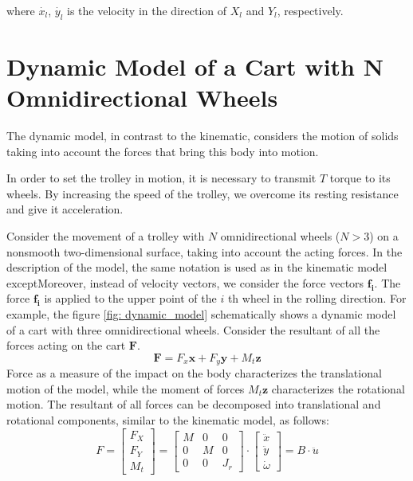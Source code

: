 \documentclass[oneside,final,14pt]{extreport}
\newcommand{\bs}{\boldsymbol}
\begin{document}
where $ \dot{x_{l}} $, $ \dot{y_{l}} $ is the velocity in the direction of $ X_{l} $ and $ Y_{l} $, respectively.
\fi

\chapter{Dynamic Model of a Cart with N Omnidirectional Wheels}
The dynamic model, in contrast to the kinematic, considers the motion of solids taking into account the forces that bring this body into motion.
 
In order to set the trolley in motion, it is necessary to transmit $ T $ torque to its wheels. By increasing the speed of the trolley, we overcome its resting resistance and give it acceleration.
 
Consider the movement of a trolley with $ N $ omnidirectional wheels ($ N> 3 $) on a nonsmooth two-dimensional surface, taking into account the acting forces. In the description of the model, the same notation is used as in the kinematic model exceptMoreover, instead of velocity vectors, we consider the force vectors $ \bs{f_{i}} $. The force $ \bs{f_{i}} $ is applied to the upper point of the $ i $ th wheel in the rolling direction. For example, the figure \ref{fig: dynamic_model} schematically shows a dynamic model of a cart with three omnidirectional wheels. Consider the resultant of all the forces acting on the cart $ \bs{F} $.
\begin{equation}
\bs{F}
=
F_{x} \bs{x}
+
F_{y} \bs{y}
+
M_{t} \bs{z}
\end{equation}
Force as a measure of the impact on the body characterizes the translational motion of the model, while the moment of forces $ M_{t} \bs{z} $ characterizes the rotational motion. The resultant of all forces can be decomposed into translational and rotational components, similar to the kinematic model, as follows:
\begin{equation}
F
=
\begin{bmatrix}
F_{X} \\
F_{Y} \\
M_{t}
\end{bmatrix}
=
\begin{bmatrix}
M & 0 & 0 \\
0 & M & 0 \\
0 & 0 & J_{r}
\end{bmatrix}
\cdot
\begin{bmatrix}
\ddot{x} \\
\ddot{y} \\
\dot{\omega}
\end{bmatrix}
=
B \cdot \ddot{u}
\end{equation}
\end{document}
